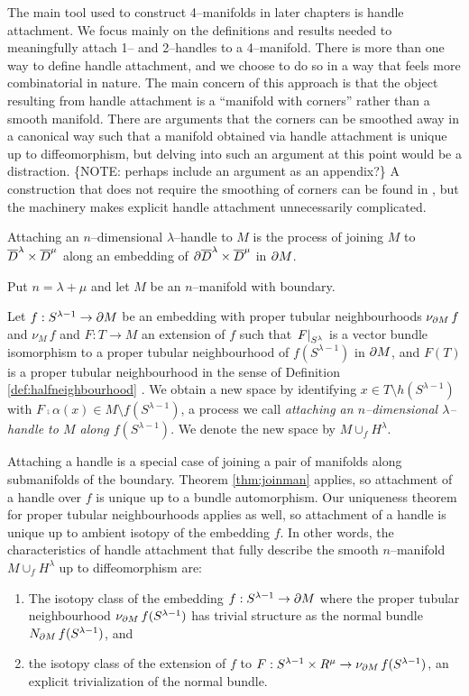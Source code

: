 The main tool used to construct 4--manifolds in later chapters is handle attachment.
We focus mainly on the definitions and results needed to meaningfully attach 1-- and 2--handles to a 4--manifold.
There is more than one way to define handle attachment, and we choose to do so in a way that feels more combinatorial in nature.
The main concern of this approach is that the object resulting from handle attachment is a ``manifold with corners'' rather than a smooth manifold.
There are arguments that the corners can be smoothed away in a canonical way such that a manifold obtained via handle attachment is unique up to diffeomorphism, but delving into such an argument at this point would be a distraction.
\{NOTE: perhaps include an argument as an appendix?\}
A construction that does not require the smoothing of corners can be found in \cite{Kosi93}, but the machinery makes explicit handle attachment unnecessarily complicated.


Attaching an $n$--dimensional $\lambda$--handle to $M$ is the process of joining $M$ to $\overline{D}^\lambda\times\overline{D}^\mu$ along an embedding of $\partial\overline{D}^\lambda\times\overline{D}^\mu$ in $\partial M$.


\begin{defn}[Handle]
	Put $n=\lambda+\mu$ and let $M$ be an $n$--manifold with boundary.
	
	
	Let $f:S^{\lambda-1}\to \partial M$ be an embedding with proper tubular neighbourhoods $\nu_{\partial M}\,f$ and $\nu_M\,f$ and $F:T\to M$ an extension of $f$ such that $\left.F\right|_{S^\lambda}$ is a vector bundle isomorphism to a proper tubular neighbourhood of $f(S^{\lambda-1})$ in $\partial M$, and $F(T)$ is a proper tubular neighbourhood in the sense of Definition \ref{def:halfneighbourhood} .
	We obtain a new space by identifying $x\in T\setminus h(S^{\lambda-1})$ with $F\comp\alpha(x)\in M\setminus f(S^{\lambda-1})$, a process we call \emph{attaching an $n$--dimensional $\lambda$--handle to $M$ along $f(S^{\lambda-1})$}.
	We denote the new space by $M\cup_f H^\lambda$.	
\end{defn}

Attaching a handle is a special case of joining a pair of manifolds along submanifolds of the boundary.
Theorem \ref{thm:joinman} applies, so attachment of a handle over $f$ is unique up to a bundle automorphism.
Our uniqueness theorem for proper tubular neighbourhoods applies as well, so attachment of a handle is unique up to ambient isotopy of the embedding $f$.
In other words, the characteristics of handle attachment that fully describe the smooth $n$--manifold $M\cup_f H^\lambda$ up to diffeomorphism are:
\begin{enumerate}
	\item The isotopy class of the embedding $f:S^{\lambda-1}\to\partial M$ where the proper tubular neighbourhood $\nu_{\partial M}\,f(S^{\lambda-1})$ has trivial structure as the normal bundle $N_{\partial M}\,f(S^{\lambda-1})$, and 
	\item the isotopy class of the extension of $f$ to $F: S^{\lambda-1}\times R^\mu\to \nu_{\partial M}\,f(S^{\lambda-1})$, an explicit trivialization of the normal bundle.
\end{enumerate}

